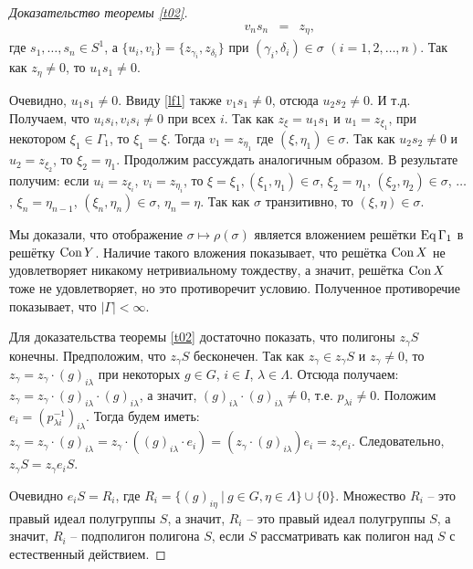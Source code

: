 \documentclass[a4paper]{article}
\newcommand{\Con}{\textnormal{Con}\, }
\newcommand{\Eq}{\textnormal{Eq}\, }
\begin{document}
\begin{proof}[Доказательство теоремы \ref{t02}]
\[\begin{array}{cccccccccccc}
		     & & & & & & & & v_ns_n & = &  z_\eta,
		\end{array} \]
		где $s_1,\ldots,s_n \in S^1$, а $\{ u_i,v_i \} = \{z_{\gamma_i},z_{\delta_i} \}$ при $(\gamma_i,\delta_i) \in \sigma$ $(i = 1,2,\ldots,n)$. Так как $z_\eta \neq 0$, то $u_1s_1 \neq 0$.
		\par Очевидно, $u_1s_1 \neq 0$. Ввиду \ref{lf1} также $v_1s_1 \neq 0$, отсюда $u_2s_2 \neq 0$. И т.д. Получаем, что $u_is_i,v_is_i \neq 0$ при всех $i$. Так как $z_\xi = u_1s_1$ и $u_1 = z_{\xi_1}$, при некотором $\xi_1 \in \Gamma_1$, то $\xi_1 = \xi$. Тогда $v_1 = z_{\eta_1}$ где $(\xi,\eta_1) \in \sigma$. Так как $u_2s_2 \neq 0$ и $u_2 = z_{\xi_2}$, то $\xi_2 = \eta_1$. Продолжим рассуждать аналогичным образом. В результате получим: если $u_i = z_{\xi_i}$, $v_i = z_{\eta_i}$, то $\xi = \xi_1, (\xi_1,\eta_1) \in \sigma$, $\xi_2 = \eta_1$, $(\xi_2,\eta_2) \in \sigma$, $\ldots$ , $\xi_n = \eta_{n-1}$, $(\xi_n,\eta_n) \in \sigma$, $\eta_n = \eta$. Так как $\sigma$ транзитивно, то $(\xi,\eta) \in \sigma$.
		\par Мы доказали, что отображение $\sigma \mapsto \rho(\sigma)$ является вложением решётки $\Eq \Gamma_1$ в решётку $\Con Y$. Наличие такого вложения показывает, что решётка $\Con X$ не удовлетворяет никакому нетривиальному тождеству, а значит, решётка $\Con X$ тоже не удовлетворяет, но это противоречит условию. Полученное противоречие показывает, что $|\Gamma| < \infty$.
		\par Для доказательства теоремы \ref{t02} достаточно показать, что полигоны $z_\gamma S$ конечны. Предположим, что $z_\gamma S$ бесконечен. Так как $z_\gamma \in z_\gamma S$ и $z_\gamma \neq 0$, то $z_\gamma = z_\gamma \cdot (g)_{i \lambda}$ при некоторых $g \in G$, $i \in I$, $\lambda \in \Lambda$. Отсюда получаем: $z_\gamma = z_\gamma \cdot (g)_{i\lambda} \cdot (g)_{i \lambda}$, а значит, $(g)_{i \lambda} \cdot (g)_{i \lambda} \neq 0$, т.е. $p_{\lambda i} \neq 0$. Положим $e_i = (p_{\lambda i}^{-1})_{i \lambda}$. Тогда будем иметь: $z_\gamma = z_\gamma \cdot (g)_{i \lambda} = z_\gamma \cdot ((g)_{i \lambda} \cdot e_i) = (z_\gamma \cdot (g)_{i \lambda})e_i = z_\gamma e_i$. Следовательно, $z_\gamma S = z_\gamma e_i S$.
		\par Очевидно $e_i S = R_i$, где $R_i = \{ (g)_{i \eta} \: | \: g \in G, \eta \in \Lambda \} \cup \{ 0 \}$. Множество $R_i$ -- это правый идеал полугруппы $S$, а значит, $R_i$ -- это правый идеал полугруппы $S$, а значит, $R_i$ -- подполигон полигона $S$, если $S$ рассматривать как полигон над $S$ с естественный действием.

\end{proof}
\end{document}
